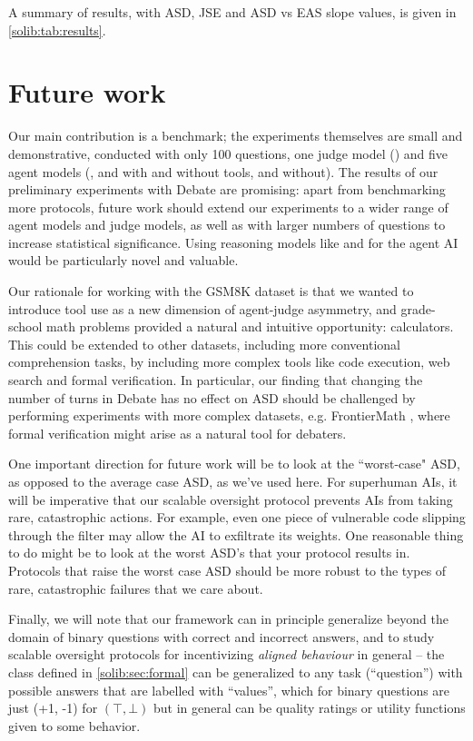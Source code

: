 A summary of results, with ASD, JSE and ASD vs EAS slope values, is given in \cref{solib:tab:results}. 



\section{Future work}

Our main contribution  is a benchmark; the experiments themselves are small and demonstrative, conducted with only 100 questions, one judge model (\gptmini{}) and five agent models (\claudenewsonnet{}, and \claudehaiku{} with and without tools, and \deepseek{} without). The results of our preliminary experiments with Debate are promising: apart from benchmarking more protocols, future work should extend our experiments to a wider range of agent models and judge models, as well as with larger numbers of questions to increase statistical significance. Using reasoning models like \deepseekr{} and \othree{} for the agent AI would be particularly novel and valuable.

Our rationale for working with the GSM8K dataset is that we wanted to introduce tool use as a new dimension of agent-judge asymmetry, and grade-school math problems provided a natural and intuitive opportunity: calculators. This could be extended to other datasets, including more conventional comprehension tasks, by including more complex tools like code execution, web search and formal verification. In particular, our finding that changing the number of turns in Debate has no effect on ASD should be challenged by performing experiments with more complex datasets, e.g. FrontierMath \citep{glazer2024frontiermathbenchmarkevaluatingadvanced}, where formal verification might arise as a natural tool for debaters.

One important direction for future work will be to look at the ``worst-case" ASD, as opposed to the average case ASD, as we've used here. For superhuman AIs, it will be imperative that our scalable oversight protocol prevents AIs from taking rare, catastrophic actions. For example, even one piece of vulnerable code slipping through the filter may allow the AI to exfiltrate its weights.  One reasonable thing to do might be to look at the worst ASD's that your protocol results in. Protocols that raise the worst case ASD should be more robust to the types of rare, catastrophic failures that we care about.

Finally, we will note that our framework can in principle generalize beyond the domain of binary questions with correct and incorrect answers, and to study scalable oversight protocols for incentivizing \emph{aligned behaviour} in general -- the class defined in \cref{solib:sec:formal} can be generalized to any task (``question'') with possible answers that are labelled with ``values'', which for binary questions are just (+1, -1) for $(\top,\bot)$ but in general can be quality ratings or utility functions given to some behavior.%


